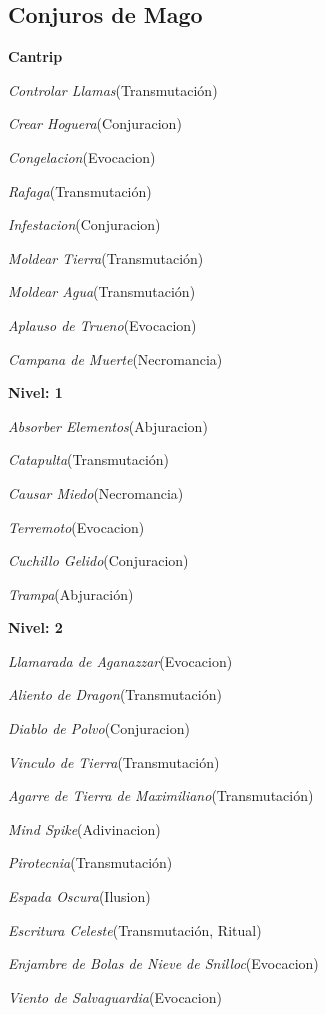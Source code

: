 \documentclass[a4paper,twocolumn,openany,10pt]{dndbook}
\begin{document}
\subsection*{Conjuros de Mago}
\begin{list}{}{}
	\item \textbf{Cantrip}
	\begin{list}{}{}
		\item \textit{Controlar Llamas}(Transmutación)
		\item \textit{Crear Hoguera}(Conjuracion)
		\item \textit{Congelacion}(Evocacion)
		\item \textit{Rafaga}(Transmutación)
		\item \textit{Infestacion}(Conjuracion)
		\item \textit{Moldear Tierra}(Transmutación)
		\item \textit{Moldear Agua}(Transmutación)
		\item \textit{Aplauso de Trueno}(Evocacion)
		\item \textit{Campana de Muerte}(Necromancia)
	\end{list}

	\item \textbf{Nivel: 1}
	\begin{list}{}{}
		\item \textit{Absorber Elementos}(Abjuracion)
		\item \textit{Catapulta}(Transmutación)
		\item \textit{Causar Miedo}(Necromancia)
		\item \textit{Terremoto}(Evocacion)
		\item \textit{Cuchillo Gelido}(Conjuracion)
		\item \textit{Trampa}(Abjuración)
	\end{list}

	\item \textbf{Nivel: 2}
	\begin{list}{}{}
		\item \textit{Llamarada de Aganazzar}(Evocacion)
		\item \textit{Aliento de Dragon}(Transmutación)
		\item \textit{Diablo de Polvo}(Conjuracion)
		\item \textit{Vinculo de Tierra}(Transmutación)
		\item \textit{Agarre de Tierra de Maximiliano}(Transmutación)
		\item \textit{Mind Spike}(Adivinacion)
		\item \textit{Pirotecnia}(Transmutación)
		\item \textit{Espada Oscura}(Ilusion)
		\item \textit{Escritura Celeste}(Transmutación, Ritual)
		\item \textit{Enjambre de Bolas de Nieve de Snilloc}(Evocacion)
		\item \textit{Viento de Salvaguardia}(Evocacion)
	\end{list}


\end{list}
\end{document}
